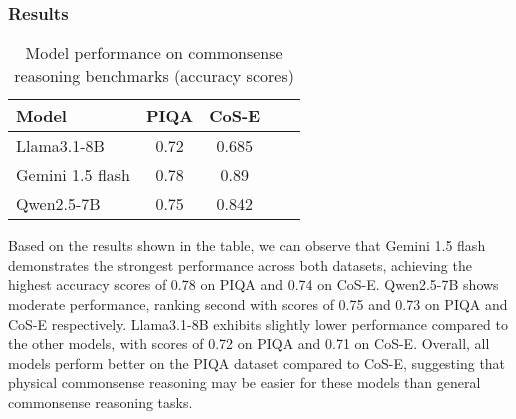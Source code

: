 \subsubsection{Results}


\begin{table}[ht]
  \centering
  \begin{tabular}{|l|c|c|c|c|}
      \hline
      \textbf{Model} & \textbf{PIQA} & \textbf{CoS-E} \\ \hline
      
      Llama3.1-8B & 0.72 & 0.685 \\ \hline
      
      Gemini 1.5 flash & 0.78 & 0.89\\ \hline
      
      Qwen2.5-7B & 0.75 & 0.842 \\ \hline

  \end{tabular}
  \caption{Model performance on commonsense reasoning benchmarks (accuracy scores)}
  \label{tab:model_comparison}
\end{table}

Based on the results shown in the table, we can observe that Gemini 1.5 flash demonstrates the strongest performance across both datasets, achieving the highest accuracy scores of 0.78 on PIQA and 0.74 on CoS-E. Qwen2.5-7B shows moderate performance, ranking second with scores of 0.75 and 0.73 on PIQA and CoS-E respectively. Llama3.1-8B exhibits slightly lower performance compared to the other models, with scores of 0.72 on PIQA and 0.71 on CoS-E. Overall, all models perform better on the PIQA dataset compared to CoS-E, suggesting that physical commonsense reasoning may be easier for these models than general commonsense reasoning tasks.


